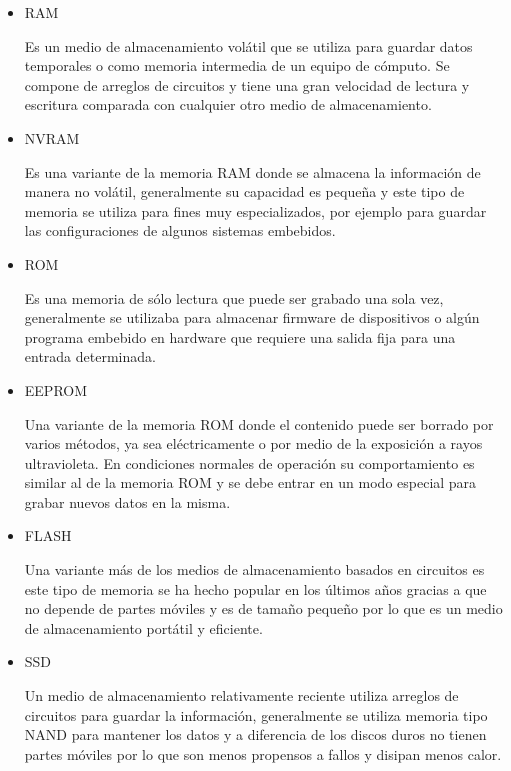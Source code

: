 \begin{itemize}

  \item RAM
  
  Es un medio de almacenamiento vol\'{a}til que se utiliza para guardar datos temporales o como memoria intermedia de un equipo de c\'{o}mputo. Se compone de arreglos de circuitos y tiene una gran velocidad de lectura y escritura comparada con cualquier otro medio de almacenamiento.
  
  \item NVRAM
  
  Es una variante de la memoria RAM donde se almacena la informaci\'{o}n de manera no vol\'{a}til, generalmente su capacidad es peque\~{n}a y este tipo de memoria se utiliza para fines muy especializados, por ejemplo para guardar las configuraciones de algunos sistemas embebidos.
  
  \item ROM
  
  Es una memoria de s\'{o}lo lectura que puede ser grabado una sola vez, generalmente se utilizaba para almacenar firmware de dispositivos o alg\'{u}n programa embebido en hardware que requiere una salida fija para una entrada determinada.
  
  \item EEPROM
  
  Una variante de la memoria ROM donde el contenido puede ser borrado por varios m\'{e}todos, ya sea el\'{e}ctricamente o por medio de la exposici\'{o}n a rayos ultravioleta. En condiciones normales de operaci\'{o}n su comportamiento es similar al de la memoria ROM y se debe entrar en un modo especial para grabar nuevos datos en la misma.
  
  \item FLASH
  
  Una variante m\'{a}s de los medios de almacenamiento basados en circuitos es este tipo de memoria se ha hecho popular en los \'{u}ltimos a\~{n}os gracias a que no depende de partes m\'{o}viles y es de tama\~{n}o peque\~{n}o por lo que es un medio de almacenamiento port\'{a}til y eficiente.
  
  \item SSD
  
  Un medio de almacenamiento relativamente reciente utiliza arreglos de circuitos para guardar la informaci\'{o}n, generalmente se utiliza memoria tipo NAND para mantener los datos y a diferencia de los discos duros no tienen partes m\'{o}viles por lo que son menos propensos a fallos y disipan menos calor.
  
\end{itemize}

